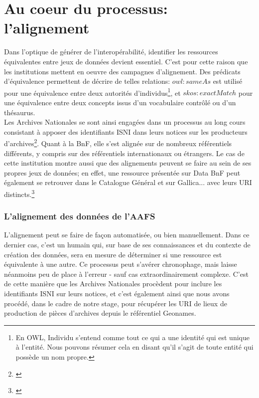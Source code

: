 \documentclass[a4paper,12pt,twoside]{book}
\begin{document}
\section{Au coeur du processus: l'alignement}

Dans l'optique de générer de l'interopérabilité, identifier les ressources équivalentes entre jeux de données devient essentiel. C'est pour cette raison que les institutions mettent en oeuvre des campagnes d'alignement. Des prédicats d'équivalence permettent de décrire de telles relations: \textit{$owl{:}sameAs$} est utilisé pour une équivalence entre deux autorités d'\og individus\fg\footnote{En OWL, \og Individu \fg{} s'entend comme tout ce qui a une identité qui est unique à l'entité. Nous pouvons résumer cela en disant qu'il s'agit de toute entité qui possède un nom propre.}, et \textit{$skos{:}exactMatch$} pour une équivalence entre deux concepts issus d'un vocabulaire contrôlé ou d'un thésaurus.\\

Les Archives Nationales se sont ainsi engagées dans un processus au long cours consistant à apposer des identifiants ISNI dans leurs notices sur les producteurs d'archives\footnote{\cite[p.~86]{clavaudTransformerMetadonneesArchives2019}}. Quant à la BnF, elle s'est alignée sur de nombreux référentiels différents, y compris sur des référentiels internationaux ou étrangers. Le cas de cette institution montre aussi que des alignements peuvent se faire au sein de ses propres jeux de données; en effet, une ressource présentée sur Data BnF peut également se retrouver dans le Catalogue Général et sur Gallica... avec leurs URI distincts.\footnote{\cite{bibliothequenationaledefranceWebSemantiqueModele2023}}\\


\subsubsection{L'alignement des données de l'AAFS}\label{2-alignement-AAFS}

L'alignement peut se faire de façon automatisée, ou bien manuellement. Dans ce dernier cas, c'est un humain qui, sur base de ses connaissances et du contexte de création des données, sera en mesure de déterminer si une ressource est équivalente à une autre. Ce processus peut s'avérer chronophage, mais laisse néanmoins peu de place à l'erreur - sauf cas extraordinairement complexe. C'est de cette manière que les Archives Nationales procèdent pour inclure les identifiants ISNI sur leurs notices, et c'est également ainsi que nous avons procédé, dans le cadre de notre stage, pour récupérer les URI de lieux de production de pièces d'archives depuis le référentiel Geonames.\\
\end{document}
